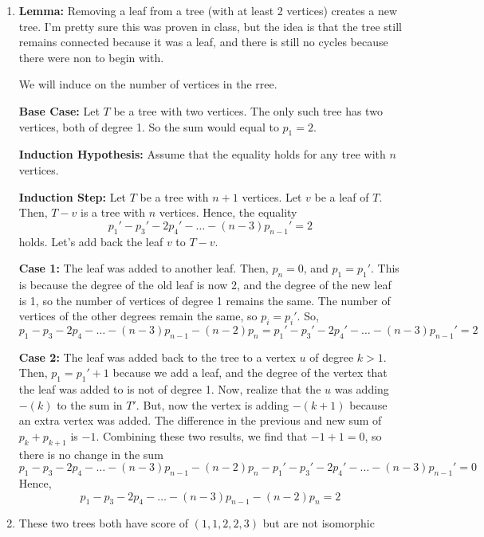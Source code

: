 \documentclass[12pt]{article}
\begin{document}

\begin{enumerate}[start=1,label={\bfseries Problem \arabic*:},leftmargin=1in] %
    \item \textbf{Lemma:} Removing a leaf from a tree (with at least 2 vertices) creates a new tree. I'm pretty sure this was proven in class, but the idea is that the tree still remains connected because it was a leaf, and there is still no cycles because there were non to begin with. 
    
    We will induce on the number of vertices in the rree. 

    \textbf{Base Case:} Let $T$ be a tree with two vertices. The only such tree has two vertices, both of degree 1. So the sum would equal to $p_{1} = 2$. 

    \textbf{Induction Hypothesis:} Assume that the equality holds for any tree with $n$ vertices.

    \textbf{Induction Step:} Let $T$ be a tree with $n+1$ vertices. Let $v$ be a leaf of $T$. Then, $T - v$ is a tree with $n$ vertices. 
    Hence, the equality 
    \[
        p_{1}' - p_{3}' - 2 p_{4}' - \dots - (n-3)p_{n-1}' = 2
    \]
    holds. Let's add back the leaf $v$ to $T - v$. 

    \textbf{Case 1:} The leaf was added to another leaf. Then, $p_{n} = 0$, and $p_{1} = p_{1}'$. This is because the degree of the old leaf is now 2, and the degree of the new leaf is 1, so the number of vertices of degree 1 remains the same.
    The number of vertices of the other degrees remain the same, so $p_{i} = p_{i}'$. 
    So, 
    \[
        p_{1} - p_{3} - 2 p_{4} - \dots - (n-3)p_{n-1} - (n-2)p_{n} =  p_{1}' - p_{3}' - 2 p_{4}' - \dots - (n-3)p_{n-1}' = 2
    \]

    \textbf{Case 2:} The leaf was added back to the tree to a vertex $u$ of degree $k > 1$. Then, $p_{1} = p_{1}' + 1$ because we add a leaf, and the degree of the vertex that the leaf was added to is not of degree 1. 
    Now, realize that the $u$ was adding $-(k)$ to the sum in $T'$. But, now the vertex is adding $-(k+1)$ because an extra vertex was added. The difference in the previous and new sum of $p_{k} + p_{k+1}$ is $-1$.
    Combining these two results, we find that $-1 + 1 = 0$, so there is no change in the sum 
    \[
        p_{1} - p_{3} - 2 p_{4} - \dots - (n-3)p_{n-1} - (n-2)p_{n} -  p_{1}' - p_{3}' - 2 p_{4}' - \dots - (n-3)p_{n-1}' = 0
    \]
    Hence, 
    \[
        p_{1} - p_{3} - 2 p_{4} - \dots - (n-3)p_{n-1} - (n-2)p_{n} = 2 
    \]
    \item These two trees both have score of $(1, 1, 2, 2, 3)$ but are not isomorphic 
    

\end{enumerate}
\end{document}
